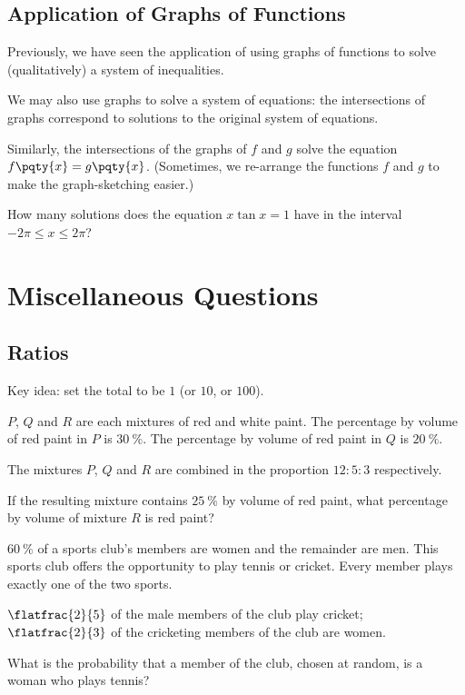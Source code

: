 \documentclass{article}
\begin{document}
\subsection{Application of Graphs of Functions}

Previously, we have seen the application of using graphs of functions to solve (qualitatively) a system of inequalities.

We may also use graphs to solve a system of equations: the intersections of graphs correspond to solutions to the original system of equations.

Similarly, the intersections of the graphs of \(f\) and \(g\) solve the equation \(f\pqty{x} = g\pqty{x}\). (Sometimes, we re-arrange the functions \(f\) and \(g\) to make the graph-sketching easier.)

\begin{example}[TMUA 2016 P1 Q10]
    How many solutions does the equation \(x \tan x = 1\) have in the interval \(-2 \pi \leq x \leq 2\pi\)?
\end{example}

\section{Miscellaneous Questions}

\subsection{Ratios}

Key idea: set the total to be \(1\) (or \(10\), or \(100\)).

\begin{example}[TMUA 2016 P1 Q6]
    \(P\), \(Q\) and \(R\) are each mixtures of red and white paint. The percentage by volume of red paint in \(P\) is \(\SI{30}{\percent}\). The percentage by volume of red paint in \(Q\) is \(\SI{20}{\percent}\).

    The mixtures \(P\), \(Q\) and \(R\) are combined in the proportion \(12 : 5 : 3\) respectively.

    If the resulting mixture contains \(\SI{25}{\percent}\) by volume of red paint, what percentage by volume of mixture \(R\) is red paint?
\end{example}

\begin{example}[TMUA 2016 P1 Q7]
    \(\SI{60}{\percent}\) of a sports club's members are women and the remainder are men. This sports club offers the opportunity to play tennis or cricket. Every member plays exactly one of the two sports.

    \(\flatfrac{2}{5}\) of the male members of the club play cricket; \(\flatfrac{2}{3}\) of the cricketing members of the club are women.

    What is the probability that a member of the club, chosen at random, is a woman who plays tennis?
\end{example}
\end{document}
